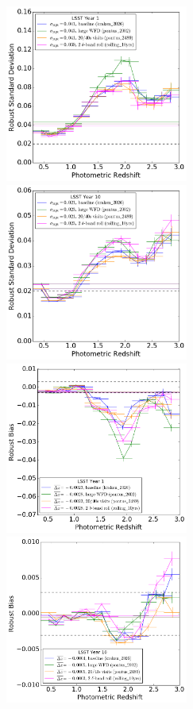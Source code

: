 \begin{figure}
\begin{center}
\includegraphics[width=6cm,trim={0cm 0cm 0cm 0cm},clip]{figures/year1_IQRs.png}
\includegraphics[width=6cm,trim={0cm 0cm 0cm 0cm},clip]{figures/year10_IQRs.png}
\includegraphics[width=6cm,trim={0cm 0cm 0cm 0cm},clip]{figures/year1_bias.png}
\includegraphics[width=6cm,trim={0cm 0cm 0cm 0cm},clip]{figures/year10_bias.png}

\end{center}
\end{figure}
